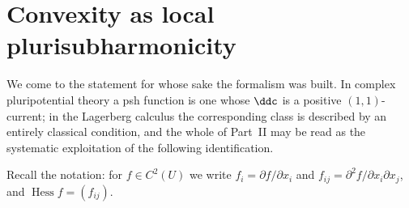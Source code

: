 \section{Convexity as local plurisubharmonicity}
\label{sec:ch09-convexity}

We come to the statement for whose sake the formalism was built.  In complex
pluripotential theory a psh function is one whose $\ddc$ is a positive
$(1,1)$-current; in the Lagerberg calculus the corresponding class is
described by an entirely classical condition, and the whole of Part~II may be
read as the systematic exploitation of the following identification.

Recall the notation: for $f\in C^2(U)$ we write $f_i=\partial f/\partial x_i$
and $f_{ij}=\partial^2f/\partial x_i\partial x_j$, and
$\operatorname{Hess}f=(f_{ij})$.


